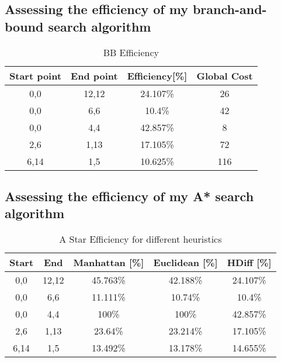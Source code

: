 \documentclass[11pt,oneside]{article}
\begin{document}

 
\subsection{Assessing the efficiency of my branch-and-bound search algorithm}
\begin{table}[ht]
    \centering
    \begin{tabular}{|c|c|c|c|}
        Start point & End point   & Efficiency[\%] & Global Cost \\ \hline
        0,0 & 12,12 & 24.107\% & 26 \\
        0,0 & 6,6 & 10.4\% & 42 \\
        0,0 & 4,4 & 42.857\% & 8 \\
        2,6 & 1,13 & 17.105\% & 72 \\
        6,14 & 1,5 & 10.625\% & 116 \\
    \end{tabular}
    \caption{BB Efficiency}
    \label{tab:my_label}
\end{table}
\subsection{Assessing the efficiency of my A* search algorithm}
\begin{table}[ht]
    \centering
    \begin{tabular}{|c|c|c|c|c|}
        Start & End   & Manhattan [\%] & Euclidean [\%] & HDiff [\%]\\ \hline
        0,0 & 12,12 & 45.763\% & 42.188\% & 24.107\% \\
        0,0 & 6,6 & 11.111\% & 10.74\% & 10.4\% \\
        0,0 & 4,4 & 100\% & 100\% & 42.857\% \\
        2,6 & 1,13 & 23.64\% & 23.214\% & 17.105\% \\
        6,14 & 1,5 & 13.492\% & 13.178\% & 14.655\% \\
    \end{tabular}
    \caption{A Star Efficiency for different heuristics}
    \label{tab:my_label}
\end{table}
\end{document}
